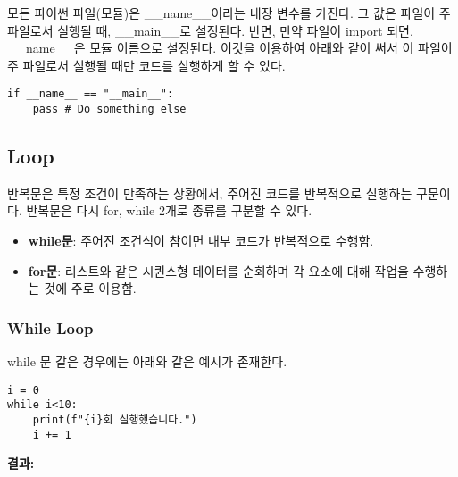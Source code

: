 모든 파이썬 파일(모듈)은 \_\_name\_\_이라는 내장 변수를 가진다. 그 값은 파일이 주 파일로서 실행될 때, \_\_main\_\_로 설정된다. 반면, 만약 파일이 import 되면, \_\_name\_\_은 모듈 이름으로 설정된다. 이것을 이용하여 아래와 같이 써서 이 파일이 주 파일로서 실행될 때만 코드를 실행하게 할 수 있다.

\begin{tcolorbox}[colframe=black, colback=white]
\begin{verbatim}
if __name__ == "__main__":
    pass # Do something else
\end{verbatim}
\end{tcolorbox}

\subsection{Loop}

반복문은 특정 조건이 만족하는 상황에서, 주어진 코드를 반복적으로 실행하는 구문이다. 반복문은 다시 for, while 2개로 종류를 구분할 수 있다.

\begin{itemize}
    \item \textbf{while문}: 주어진 조건식이 참이면 내부 코드가 반복적으로 수행함.
    \item \textbf{for문}: 리스트와 같은 시퀸스형 데이터를 순회하며 각 요소에 대해 작업을 수행하는 것에 주로 이용함.
\end{itemize}

\subsubsection{While Loop}
while 문 같은 경우에는 아래와 같은 예시가 존재한다.

\begin{minipage}{\textwidth}
\begin{tcolorbox}[colframe=black, colback=white]
\begin{verbatim}
i = 0
while i<10:
    print(f"{i}회 실행했습니다.")
    i += 1
\end{verbatim}
\end{tcolorbox}
\textbf{결과: }
\end{minipage}

